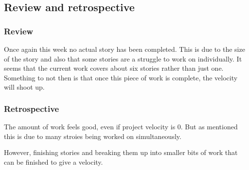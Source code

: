 \subsection{Review and retrospective}
\subsubsection{Review}
Once again this week no actual story has been completed. This is due to the size of the story and also that some stories are a struggle to work on individually. It seems that the current work covers about six stories rather than just one. Something to not then is that once this piece of work is complete, the velocity will shoot up.

\subsubsection{Retrospective}
The amount of work feels good, even if project velocity is 0. But as mentioned this is due to many stroies being worked on simultaneously.

However, finishing stories and breaking them up into smaller bits of work that can be finished to give a velocity.
\newpage
